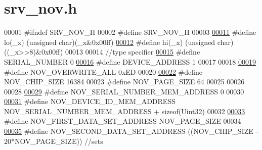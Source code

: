 \hypertarget{a00029_source}{\section{srv\+\_\+nov.\+h}
\label{a00029_source}
}

\begin{DoxyCode}
00001 \textcolor{preprocessor}{#ifndef SRV\_NOV\_H}
00002 \textcolor{preprocessor}{#define SRV\_NOV\_H}
00003 
\hypertarget{a00029_source_l00011}{}\hyperlink{a00029_a5fadc1fcee76b0cab65e127bcd21b314}{00011} \textcolor{preprocessor}{#define lo(\_x)   (unsigned char)(\_x&0x00ff)}
\hypertarget{a00029_source_l00012}{}\hyperlink{a00029_ad27bf81761e0eaf90d05c3eb4d343d5a}{00012} \textcolor{preprocessor}{#define hi(\_x)   (unsigned char)((\_x>>8)&0x00ff)}
00013 
00014 \textcolor{comment}{//type specifier}
\hypertarget{a00029_source_l00015}{}\hyperlink{a00029_ad8a20d143f6a7579ed227578aeddec21}{00015} \textcolor{preprocessor}{#define SERIAL\_NUMBER                          0}
\hypertarget{a00029_source_l00016}{}\hyperlink{a00029_a457be1c5e5fee67ed7d01f5887c2d656}{00016} \textcolor{preprocessor}{#define DEVICE\_ADDRESS                         1}
00017 
00018 
\hypertarget{a00029_source_l00019}{}\hyperlink{a00029_aa3471d8e4814035dc24211c0890899bb}{00019} \textcolor{preprocessor}{#define NOV\_OVERWRITE\_ALL                                      0xED}
00020 
\hypertarget{a00029_source_l00022}{}\hyperlink{a00029_acbac04a78072f0322171ea94017f246e}{00022} \textcolor{preprocessor}{#define NOV\_CHIP\_SIZE                                          16384}
00023 \textcolor{preprocessor}{#define NOV\_PAGE\_SIZE                                          64}
00025 
00026 
00028 
\hypertarget{a00029_source_l00029}{}\hyperlink{a00029_ab7dc1ea8a7f6e16cf27fbfe88efd7285}{00029} \textcolor{preprocessor}{#define NOV\_SERIAL\_NUMBER\_MEM\_ADDRESS                          0}
00030 
\hypertarget{a00029_source_l00031}{}\hyperlink{a00029_a3ddbe5b40319c96bfe46429e902f8d33}{00031} \textcolor{preprocessor}{#define NOV\_DEVICE\_ID\_MEM\_ADDRESS                              NOV\_SERIAL\_NUMBER\_MEM\_ADDRESS +
       sizeof(Uint32)}
00032 
\hypertarget{a00029_source_l00033}{}\hyperlink{a00029_a3d5917eef9709c44acd2e6314619f440}{00033} \textcolor{preprocessor}{#define NOV\_FIRST\_DATA\_SET\_ADDRESS                             NOV\_PAGE\_SIZE}
00034 
\hypertarget{a00029_source_l00035}{}\hyperlink{a00029_ab062741a69ee7156fbdf317ec627b4ca}{00035} \textcolor{preprocessor}{#define NOV\_SECOND\_DATA\_SET\_ADDRESS                            ((NOV\_CHIP\_SIZE - 20*NOV\_PAGE\_SIZE))  //sets
}
\end{DoxyCode}
